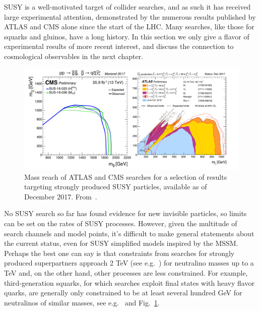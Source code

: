 SUSY is a well-motivated target of collider searches, and as such it has received large experimental attention, demonstrated by the numerous results published by ATLAS and CMS alone since the start of the LHC. 
Many searches, like those for squarks and gluinos, have a long history. 
In this section we only give a flavor of experimental results of more recent interest, and discuss the connection to cosmological observables in the next chapter. 

\begin{figure}[!htpb]
\includegraphics[width=\textwidth]{figures/SUSY_strong_ttbar.pdf}
\caption{Mass reach of ATLAS and CMS searches for a selection of results targeting strongly produced SUSY particles, available as of December 2017. From~\cite{ATLASSUSYSummary,CMSSUSYSummary}.\label{fig:SUSYSummary_strong}}
\end{figure}

No SUSY search so far has found evidence for new invisible particles, so limits can be set on the rates of SUSY processes. However, given the multitude of search channels and model points, it's difficult to make general statements about the current status, even for SUSY simplified models inspired by the MSSM. Perhaps the best one can say is that constraints from searches for strongly produced superpartners approach 2 TeV (see e.g.~\cite{Aaboud:2017bac,Sirunyan:2017yse}) for neutralino masses up to a TeV and, 
on the other hand, other processes are less constrained. For example, third-generation squarks, for which searches exploit final states with heavy flavor quarks, are generally only constrained to be at least several hundred GeV for neutralinos of similar masses, see e.g.~\cite{Sirunyan:2017wif,Aaboud:2016wna} and Fig.~\ref{fig:SUSYSummary_strong}. 

